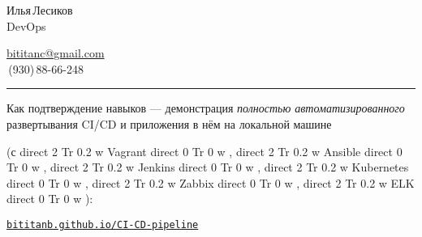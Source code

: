 \documentclass[11pt, a4paper]{article}
\newcommand\rurl[1]{%
  \href{http://#1}{\nolinkurl{#1}}%
}
\newcommand\Eng[1]{%
  \foreignlanguage{english}{#1}%
}
\renewcommand{\textbf}[1]{%
    \pdfliteral direct {2 Tr 0.2 w} %
     #1%
    \pdfliteral direct {0 Tr 0 w}%
}
\let\bf\textbf
\let\it\textit
\begin{document}
\sffamily

{\setlength\multicolsep{0pt}%
\begin{multicols}{2}

\begin{spacing}{1.5}
  {\LARGE Илья\,Лесиков}\\
  {\Large\Eng{DevOps}}\hspace{1.3cm}{\large 25\,лет}
\end{spacing}

\columnbreak

\begin{flushright}
  \begin{spacing}{1.3}
    {\large\href{mailto:bititanc@gmail.com}{\Eng{bititanc@gmail.com}}}\\
    \fontsize{1.4em}{0}\,(930)\,88-66-248 \normalsize\\
  \end{spacing}
\end{flushright}

\end{multicols}
}

\vspace{-10pt}
\textcolor[RGB]{220,220,220}{\rule{\linewidth}{0.2pt}}
\vspace{5pt}

\begin{comment}
У меня нет образования (неоконченный колледж электроники) и сомнительный стаж (10 месяцев сисадмином).\\
Но, самообучаясь, за последние пару лет я получил достаточный опыт и в общей автоматизации, и в \Eng{CI/CD}.\\
Получил некоторый опыт и в кодинге, как и хороший общий технический бэкграунд (\Eng{Linux}, сети и т.\,п.).
\end{comment}

Как подтверждение навыков — демонстрация \it{полностью автоматизированного} развертывания \Eng{CI/CD} и приложения в нём на локальной машине 
{\font=1.5pt
(с
\Eng{\textbf{Vagrant}, \bf{Ansible}, \bf{Jenkins}, \bf{Kubernetes}, \bf{Zabbix}, \bf{ELK}}):\par
}

\rurl{bititanb.github.io/CI-CD-pipeline}
\end{document}
